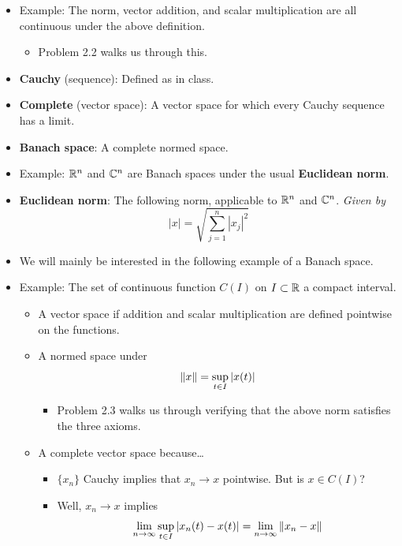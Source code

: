 \documentclass[../notes.tex]{subfiles}
\begin{document}
\begin{itemize}
    \item Example: The norm, vector addition, and scalar multiplication are all continuous under the above definition.
    \begin{itemize}
        \item Problem 2.2 walks us through this.
    \end{itemize}
    \item \textbf{Cauchy} (sequence): Defined as in class.
    \item \textbf{Complete} (vector space): A vector space for which every Cauchy sequence has a limit.
    \item \textbf{Banach space}: A complete normed space.
    \item Example: $\mathbb{R}^n$ and $\mathbb{C}^n$ are Banach spaces under the usual \textbf{Euclidean norm}.
    \item \textbf{Euclidean norm}: The following norm, applicable to $\mathbb{R}^n$ and $\mathbb{C}^n$. \emph{Given by}
    \begin{equation*}
        |x| = \sqrt{\sum_{j=1}^n|x_j|^2}
    \end{equation*}
    \item We will mainly be interested in the following example of a Banach space.
    \item Example: The set of continuous function $C(I)$ on $I\subset\mathbb{R}$ a compact interval.
    \begin{itemize}
        \item A vector space if addition and scalar multiplication are defined pointwise on the functions.
        \item A normed space under
        \begin{equation*}
            \norm{x} = \sup_{t\in I}|x(t)|
        \end{equation*}
        \begin{itemize}
            \item Problem 2.3 walks us through verifying that the above norm satisfies the three axioms.
        \end{itemize}
        \item A complete vector space because\dots
        \begin{itemize}
            \item $\{x_n\}$ Cauchy implies that $x_n\to x$ pointwise. But is $x\in C(I)$?
            \item Well, $x_n\to x$ implies
            \begin{equation*}
                \lim_{n\to\infty}\sup_{t\in I}|x_n(t)-x(t)| = \lim_{n\to\infty}\norm{x_n-x}

\end{equation*}
\end{itemize}
\end{itemize}
\end{itemize}
\end{document}
